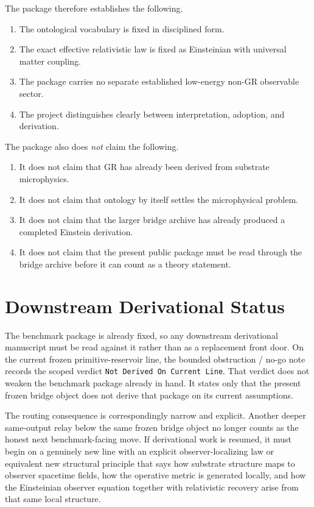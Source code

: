 \documentclass[11pt]{article}
\begin{document}
The package therefore establishes the following.
\begin{enumerate}
    \item The ontological vocabulary is fixed in disciplined form.
    \item The exact effective relativistic law is fixed as Einsteinian with universal matter coupling.
    \item The package carries no separate established low-energy non-GR observable sector.
    \item The project distinguishes clearly between interpretation, adoption, and derivation.
\end{enumerate}

The package also does \emph{not} claim the following.
\begin{enumerate}
    \item It does not claim that GR has already been derived from substrate microphysics.
    \item It does not claim that ontology by itself settles the microphysical problem.
    \item It does not claim that the larger bridge archive has already produced a completed Einstein derivation.
    \item It does not claim that the present public package must be read through the bridge archive before it can count as a theory statement.
\end{enumerate}

\section{Downstream Derivational Status}

The benchmark package is already fixed, so any downstream derivational manuscript must be read against it rather than as a replacement front door. On the current frozen primitive-reservoir line, the bounded obstruction / no-go note records the scoped verdict \texttt{Not Derived On Current Line}. That verdict does not weaken the benchmark package already in hand. It states only that the present frozen bridge object does not derive that package on its current assumptions.

The routing consequence is correspondingly narrow and explicit. Another deeper same-output relay below the same frozen bridge object no longer counts as the honest next benchmark-facing move. If derivational work is resumed, it must begin on a genuinely new line with an explicit observer-localizing law or equivalent new structural principle that says how substrate structure maps to observer spacetime fields, how the operative metric is generated locally, and how the Einsteinian observer equation together with relativistic recovery arise from that same local structure.
\end{document}
